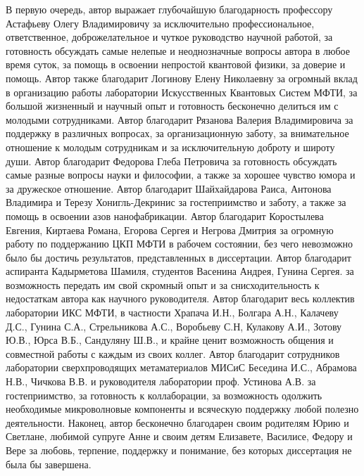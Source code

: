 В первую очередь, автор выражает глубочайшую благодарность профессору Астафьеву Олегу Владимировичу за исключительно профессиональное, ответственное, доброжелательное и чуткое руководство научной работой, за готовность обсуждать самые нелепые и неоднозначные вопросы автора в любое время суток, за помощь в освоении непростой квантовой физики, за доверие и помощь. Автор также благодарит Логинову Елену Николаевну за огромный вклад в организацию работы лаборатории Искусственных Квантовых Систем МФТИ, за большой жизненный и научный опыт и готовность бесконечно делиться им с молодыми сотрудниками. Автор благодарит Рязанова Валерия Владимировича за поддержку в различных вопросах, за организационную заботу, за внимательное отношение к молодым сотрудникам и за исключительную доброту и широту души. Автор благодарит Федорова Глеба Петровича за готовность обсуждать самые разные вопросы науки и философии, а также за хорошее чувство юмора и за дружеское отношение. Автор благодарит Шайхайдарова Раиса, Антонова Владимира и Терезу Хонигль-Декринис за гостеприимство и  заботу, а также за помощь в освоении азов нанофабрикации. Автор благодарит Коростылева Евгения, Киртаева Романа, Егорова Сергея и Негрова Дмитрия за огромную работу по поддержанию ЦКП МФТИ в рабочем состоянии, без чего невозможно было бы достичь результатов, представленных в диссертации. Автор благодарит аспиранта Кадырметова Шамиля, студентов Васенина Андрея, Гунина Сергея. за возможность передать им свой скромный опыт и за снисходительность к недостаткам автора как научного руководителя.  Автор благодарит весь коллектив лаборатории ИКС МФТИ, в частности Храпача И.Н., Болгара А.Н., Калачеву Д.С., Гунина С.А., Стрельникова А.С., Воробьеву С.Н, Кулакову А.И., Зотову Ю.В., Юрса В.Б., Сандуляну Ш.В., и крайне ценит возможность общения и совместной работы с каждым из своих коллег.  Автор благодарит сотрудников лаборатории сверхпроводящих метаматериалов МИСиС Беседина И.С., Абрамова Н.В., Чичкова В.В. и руководителя лаборатории проф. Устинова А.В. за гостеприимство, за готовность к коллаборации, за возможность одолжить необходимые микроволновые компоненты и всяческую поддержку любой полезно деятельности. Наконец, автор бесконечно благодарен своим родителям Юрию и Светлане, любимой супруге Анне и своим детям Елизавете, Василисе, Федору и Вере за любовь, терпение, поддержку и понимание, без которых диссертация не была бы завершена. 

